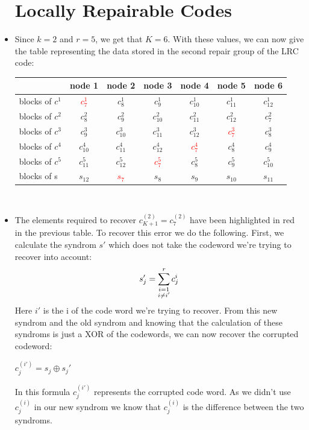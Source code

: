 \documentclass[12pt,a4paper,oneside]{article}
\begin{document}
\begin{itemize}
\section{Locally Repairable Codes}
    \item Since $k = 2$ and $r = 5$, we get that $K = 6$. With these values, we can now give the table representing the data stored in the second repair group of the LRC code:
\begin{table}[h]
\centering
\begin{tabular}{l|c|c|c|c|c|c}
                  & node 1       & node 2       & node 3       & node 4       & node 5       & node 6\\\hline
blocks of $c^{1}$ & \textcolor{red}{$c^{1}_{7}$}  & $c^{1}_{8}$  & $c^{1}_{9}$  & $c^{1}_{10}$ & $c^{1}_{11}$ & $c^{1}_{12}$\\
blocks of $c^{2}$ & $c^{2}_{8}$  & $c^{2}_{9}$  & $c^{2}_{10}$ & $c^{2}_{11}$ & $c^{2}_{12}$ & $c^{2}_{7}$\\
blocks of $c^{3}$ & $c^{3}_{9}$  & $c^{3}_{10}$ & $c^{3}_{11}$ & $c^{3}_{12}$ & \textcolor{red}{$c^{3}_{7}$}  & $c^{3}_{8}$\\
blocks of $c^{4}$ & $c^{4}_{10}$ & $c^{4}_{11}$ & $c^{4}_{12}$ & \textcolor{red}{$c^{4}_{7}$}  & $c^{4}_{8}$  & $c^{4}_{9}$\\
blocks of $c^{5}$ & $c^{5}_{11}$ & $c^{5}_{12}$ & \textcolor{red}{$c^{5}_{7}$}  & $c^{5}_{8}$  & $c^{5}_{9}$  & $c^{5}_{10}$\\
blocks of s       & $s_{12}$     & \textcolor{red}{$s_{7}$}      & $s_{8}$      & $s_{9}$      & $s_{10}$     & $s_{11}$
\end{tabular}
\end{table}\\
    \item The elements required to recover $c^{(2)}_{K + 1} = c^{(2)}_{7}$ have been highlighted in red in the previous table. To recover this error we do the following. First, we calculate the syndrom $s'$ which does not take the codeword we're trying to recover into account:
    \begin{equation}
        \centering
        s_j' = \sum^r_{\substack{i = 1\\i \neq i'}} c^i_j
    \end{equation}
    Here $i'$ is the i of the code word we're trying to recover. From this new syndrom and the old syndrom and knowing that the calculation of these syndroms is just a XOR of the codewords, we can now recover the corrupted codeword:\\
        \begin{center}
        $c^{(i')}_j = s_j \oplus s_j'$\\
        \end{center}
    In this formula $c^{(i')}_j$ represents the corrupted code word.
    As we didn't use $c^{(i)}_j$ in our new syndrom we know that $c^{(i)}_j$ is the difference between the two syndroms.\par
    

\end{itemize}
\end{document}
